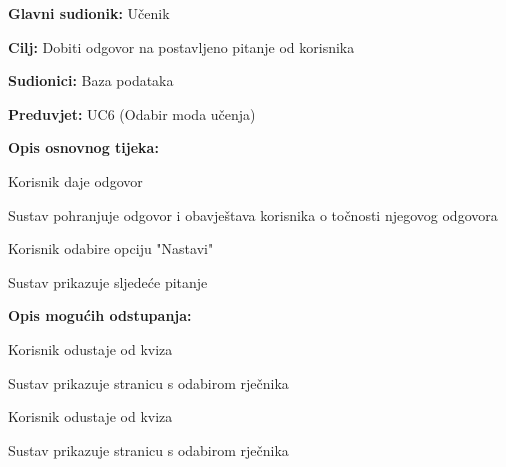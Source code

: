 					\noindent {}
					\begin{packed_item}
						
						\item \textbf{Glavni sudionik: }Učenik
						\item  \textbf{Cilj:} Dobiti odgovor na postavljeno pitanje od korisnika
						\item  \textbf{Sudionici:} Baza podataka
						\item  \textbf{Preduvjet:} UC6 (Odabir moda učenja)
						\item  \textbf{Opis osnovnog tijeka:}
						
						\item[] \begin{packed_enum}
							
							\item Korisnik daje odgovor
							\item Sustav pohranjuje odgovor i obavještava korisnika o točnosti njegovog odgovora
							\item Korisnik odabire opciju "Nastavi"
							\item Sustav prikazuje sljedeće pitanje
						\end{packed_enum}
						
						\item  \textbf{Opis mogućih odstupanja:}
						
						\item[] \begin{packed_item}
							
							\item[3.a] Korisnik odustaje od kviza
							\item[] \begin{packed_enum}
								
								\item Sustav prikazuje stranicu s odabirom rječnika
								
							\end{packed_enum}
							
							\item[4.a] Korisnik odustaje od kviza 
							\item[] \begin{packed_enum}
								
								\item Sustav prikazuje stranicu s odabirom rječnika
								
							\end{packed_enum}
							
						\end{packed_item}
					\end{packed_item}
					

